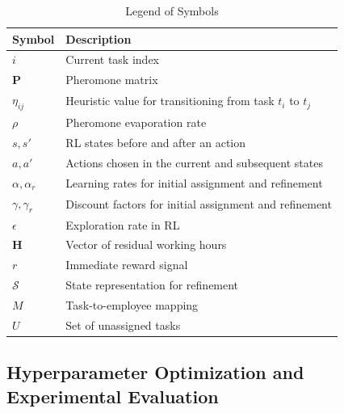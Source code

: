 \documentclass[%
aip,
cp,  %
amsmath,amssymb,
reprint,%
]{revtex4-2}
\begin{document}
	\begin{table}[!ht]
		\caption{\label{tab:legend}Legend of Symbols}
		\begin{ruledtabular}
			\begin{tabular}{ll}
				\textbf{Symbol}    & \textbf{Description}                                       \\
				\hline
				$i$                & Current task index                                         \\
				$\mathbf{P}$       & Pheromone matrix                                           \\
				$\eta_{ij}$        & Heuristic value for transitioning from task $t_i$ to $t_j$ \\
				$\rho$             & Pheromone evaporation rate                                 \\
				$s, s'$            & RL states before and after an action                       \\
				$a, a'$            & Actions chosen in the current and subsequent states        \\
				$\alpha, \alpha_r$ & Learning rates for initial assignment and refinement       \\
				$\gamma, \gamma_r$ & Discount factors for initial assignment and refinement     \\
				$\epsilon$         & Exploration rate in RL                                     \\
				$\mathbf{H}$       & Vector of residual working hours                           \\
				$r$                & Immediate reward signal                                    \\
				$\mathcal{S}$      & State representation for refinement                        \\
				$M$                & Task-to-employee mapping                                   \\
				$U$                & Set of unassigned tasks                                    \\
			\end{tabular}
		\end{ruledtabular}
	\end{table}
	
	
	\subsection{\label{subsec:hyperparameter}Hyperparameter Optimization and Experimental Evaluation}
	
\end{document}
